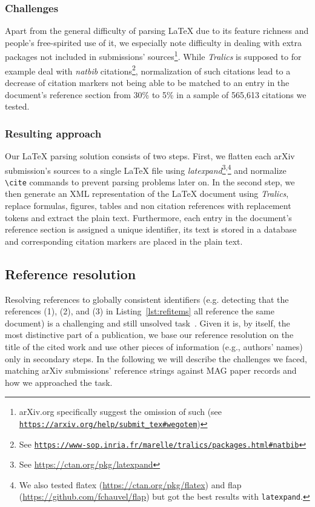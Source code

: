 \subsubsection{Challenges}
Apart from the general difficulty of parsing \LaTeX{} due to its feature richness and people's free-spirited use of it, we especially note difficulty in dealing with extra packages not included in submissions' sources\footnote{arXiv.org specifically suggest the omission of such (see \texttt{\url{https://arxiv.org/help/submit\_tex\#wegotem}})}. While \textit{Tralics} is supposed to for example deal with \textit{natbib} citations\footnote{See \texttt{\url{https://www-sop.inria.fr/marelle/tralics/packages.html\#natbib}}}, normalization of such citations lead to a decrease of citation markers not being able to be matched to an entry in the document's reference section from 30\% to 5\% in a sample of 565,613 citations we tested.

\subsubsection{Resulting approach}
Our \LaTeX{} parsing solution consists of two steps. First, we flatten each arXiv submission's sources to a single \LaTeX{} file using \textit{latexpand}\footnote{See \url{https://ctan.org/pkg/latexpand}}\textsuperscript{,}\footnote{We also tested flatex (\url{https://ctan.org/pkg/flatex}) and flap (\url{https://github.com/fchauvel/flap}) but got the best results with \texttt{latexpand}.} and normalize \texttt{\textbackslash cite} commands to prevent parsing problems later on. In the second step, we then generate an XML representation of the \LaTeX{} document using \textit{Tralics}, replace formulas, figures, tables and non citation references with replacement tokens and extract the plain text. Furthermore, each entry in the document's reference section is assigned a unique identifier, its text is stored in a database and corresponding citation markers are placed in the plain text.

\subsection{Reference resolution}\label{sec:refresol}
Resolving references to globally consistent identifiers (e.g. detecting that the references (1), (2), and (3) in Listing~\ref{lst:refitems} all reference the same document) is a challenging and still unsolved task~\cite{Nasar2018}. Given it is, by itself, the most distinctive part of a publication, we base our reference resolution on the title of the cited work and use other pieces of information (e.g., authors' names) only in secondary steps. In the following we will describe the challenges we faced, matching arXiv submissions' reference strings against MAG paper records and how we approached the task.

